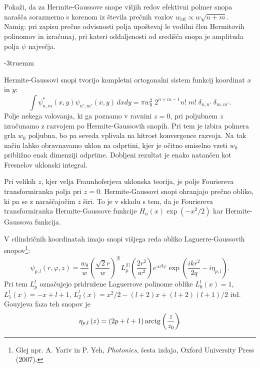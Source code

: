 \begin{naloga}
\label{naloga:HG}
Pokaži, da za Hermite-Gaussove snope višjih redov efektivni polmer snopa 
narašča sorazmerno s korenom iz števila prečnih vozlov $ w_{\mathrm{eff}}\propto w\sqrt{n+m}$.\\
Namig: pri zapisu prečne odvisnosti polja upoštevaj le vodilni člen Hermitovih polinomov 
in izračunaj, pri kateri oddaljenosti od središča snopa je amplituda polja $\psi$ največja.
\end{naloga}
\vglue-3truemm
\begin{remark}
 Hermite-Gaussovi snopi tvorijo kompletni
ortogonalni sistem funkcij koordinat $x$ in $y$:
\begin{equation}
\int\psi_{n,m}^{*}(x,y)\psi_{n',m'}(x,y)\, dx dy=\pi w_{0}^{2}\; 
2^{n+m-1}n!\;m!\; \delta_{n,n'}\;\delta_{m,m'}.
\end{equation}
Polje nekega valovanja, ki ga poznamo v ravnini $z=0$, pri
poljubnem $z$ izračunamo z razvojem po Hermite-Gaussovih snopih. Pri tem
je izbira polmera grla $w_{0}$ poljubna, bo pa seveda vplivala na
hitrost konvergence razvoja. Na tak način lahko obravnavamo uklon
na odprtini, kjer je očitno smiselno vzeti $w_{0}$ približno enak
dimenziji odprtine. Dobljeni rezultat je enako natančen kot Fresnelov
uklonski integral.

Pri velikih $z$, kjer velja Fraunhoferjeva uklonska teorija, je
polje Fouriereva transformiranka polja pri $z=0$. Hermite-Gaussovi
snopi ohranjajo prečno obliko, ki pa se z naraščajočim $z$ širi. 
To je v skladu s tem, da je Fouriereva transformiranka Hermite-Gaussove funkcije 
$H_{n}(x)\exp(-x^{2}/2)$ kar Hermite-Gaussova funkcija.
\end{remark}

V cilindričnih koordinatah imajo snopi višjega reda obliko Laguerre-Gaussovih 
snopov\footnote{Glej npr. A. Yariv in P.
Yeh, {\it Photonics}, šesta izdaja, Oxford
University Press (2007).}:
\begin{equation}
\psi_{p,l}(r,\varphi,z)=\frac{w_{0}}{w}\left(\frac{\sqrt{2}r}{w}\right)^{|l|}
L_{p}^{|l|}\left(\frac{2r^{2}}{w^{2}}\right)e^{\pm il\varphi}\exp\left(\frac{ikr^{2}}{2q}-i\eta_{p,l}\right)\!\!.
\label{eq:Gauss-Laguerrevi}
\end{equation}
Pri tem $L_{p}^{l}$ označujejo pridružene Laguerrove polinome oblike $L_{0}^{l}(x) = 1$, 
$L_{1}^{l}(x) = -x+l+1$, 
$L_{2}^{l}(x) = x^2/2-(l+2)x+(l+2)(l+1)/2$ itd. Gouyjeva faza teh snopov je 
\begin{equation}\index{Gouyeva faza}
\eta_{p,l}\left(z\right)=(2p+l+1)\arctan\left(\frac{z}{z_{0}}\right)\!\!.
\label{eq:etaGL}
\end{equation}

